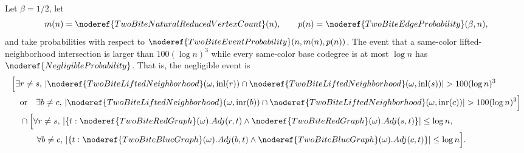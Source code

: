 \begin{helper}[FiberAndDegreeSameColorLiftedIntersectionSharpBaseNegligible]
\label{helper:FiberAndDegreeSameColorLiftedIntersectionSharpBaseNegligible}
Let \(\beta=1/2\), let
\[
m(n)=\noderef{TwoBiteNaturalReducedVertexCount}(n),
\qquad
p(n)=\noderef{TwoBiteEdgeProbability}(\beta,n),
\]
and take probabilities with respect to
\(\noderef{TwoBiteEventProbability}(n,m(n),p(n))\).  The event that a
same-color lifted-neighborhood intersection is larger than
\(100(\log n)^3\) while every same-color base codegree is at most \(\log n\)
has \(\noderef{NegligibleProbability}\).  That is, the negligible event is
\[
\begin{aligned}
&\Bigl[
\exists r\ne s,\,
|\noderef{TwoBiteLiftedNeighborhood}(\omega,\operatorname{inl}(r))
\cap
\noderef{TwoBiteLiftedNeighborhood}(\omega,\operatorname{inl}(s))|
>100(\log n)^3\\
&\quad\text{or}\quad
\exists b\ne c,\,
|\noderef{TwoBiteLiftedNeighborhood}(\omega,\operatorname{inr}(b))
\cap
\noderef{TwoBiteLiftedNeighborhood}(\omega,\operatorname{inr}(c))|
>100(\log n)^3
\Bigr]\\
&\quad\cap
\Bigl[
\forall r\ne s,\,
|\{t:\noderef{TwoBiteRedGraph}(\omega).Adj(r,t)\land
\noderef{TwoBiteRedGraph}(\omega).Adj(s,t)\}|\le\log n,\\
&\qquad\quad
\forall b\ne c,\,
|\{t:\noderef{TwoBiteBlueGraph}(\omega).Adj(b,t)\land
\noderef{TwoBiteBlueGraph}(\omega).Adj(c,t)\}|\le\log n
\Bigr].
\end{aligned}
\]
\end{helper}

